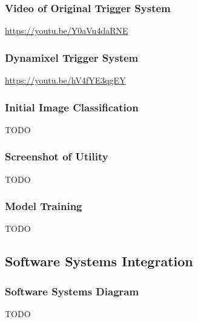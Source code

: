 \documentclass[11pt, twoside]{report}
\begin{document}
\subsubsection{Video of Original Trigger System} \label{app:ogtrig}
	\begin{center}
	\url{https://youtu.be/Y0aVu4daRNE}
	\end{center}

\subsubsection{Dynamixel Trigger System} \label{app:dyntrig}
	\begin{center}
	\url{https://youtu.be/hV4fYE3qgEY}
	\end{center}

\subsubsection{Initial Image Classification} \label{app:ogimg}
	\begin{center}
	TODO
	\end{center}

\subsubsection{Screenshot of Utility} \label{app:util}
	\begin{center}
	TODO
	\end{center}

\subsubsection{Model Training} \label{app:model}
	\begin{center}
	TODO
	\end{center}


\subsection{Software Systems Integration} \label{app:system}
\subsubsection{Software Systems Diagram} \label{app:sysdiag}
	\begin{center}
	TODO
	\end{center}
	
\end{document}

